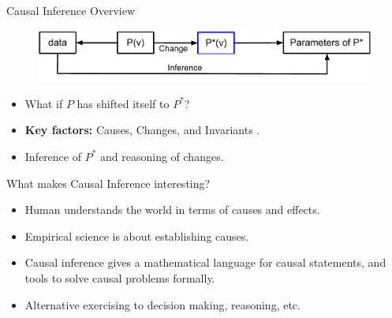 \documentclass{beamer}
\begin{document}
\begin{frame}{Causal Inference Overview}
\begin{figure}
\includegraphics[scale=0.6]{imgs/causalInf}
\end{figure}
\begin{itemize}
\item What if $P$ has shifted itself to $P^*$?
\item<2-> \textbf{Key factors:} Causes, Changes, and Invariants . 
\item<2-> Inference of $P^*$ and reasoning of changes. 
\end{itemize}
\end{frame}
\begin{frame}{What makes Causal Inference interesting?}
\begin{itemize}
\item Human understands the world in terms of causes and effects.
\item Empirical science is about establishing causes.
\item Causal inference gives a mathematical language for causal
statements, and tools to solve causal problems formally.
\item Alternative exercising to decision making, reasoning, etc.
\end{itemize}
\end{frame}
\end{document}
